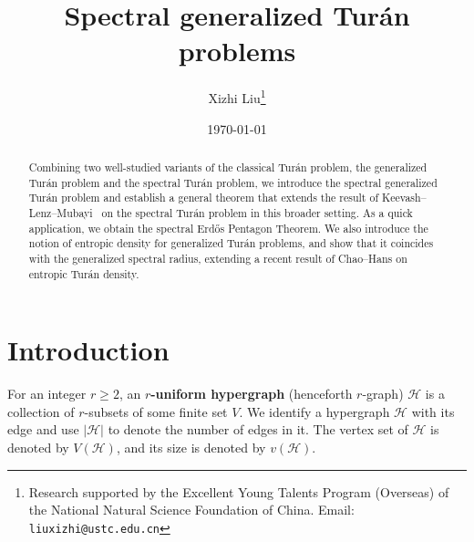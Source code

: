 \documentclass[11pt,a4paper]{article}
\begin{document}
\title{\bf\Large Spectral generalized Tur\'{a}n problems}
\date{\today}
\author[ ]{Xizhi Liu\thanks{Research supported by the Excellent Young Talents Program (Overseas) of the National Natural Science Foundation of China. Email: \texttt{liuxizhi@ustc.edu.cn}}}
\maketitle
\begin{abstract}
%
Combining two well-studied variants of the classical Tur\'{a}n problem, the generalized Tur\'{a}n problem and the spectral Tur\'{a}n problem, we introduce the spectral generalized Tur\'{a}n problem and establish a general theorem that extends the result of Keevash--Lenz--Mubayi~\cite{KLM14} on the spectral Tur\'{a}n problem in this broader setting.   
As a quick application, we obtain the spectral Erd\H{o}s Pentagon Theorem.  
We also introduce the notion of entropic density for generalized Tur\'{a}n problems, and show that it coincides with the generalized spectral radius, extending a recent result of Chao--Hans on entropic Tur\'{a}n density.
%
\end{abstract}
\section{Introduction}\label{SEC:Introduction}
%
For an integer $r\ge 2$, an \textbf{$r$-uniform hypergraph} (henceforth $r$-graph) $\mathcal{H}$ is a collection of $r$-subsets of some finite set $V$.
We identify a hypergraph $\mathcal{H}$ with its edge and use $|\mathcal{H}|$ to denote the number of edges in it. 
The vertex set of $\mathcal{H}$ is denoted by $V(\mathcal{H})$, and its size is denoted by $v(\mathcal{H})$.
\end{document}
